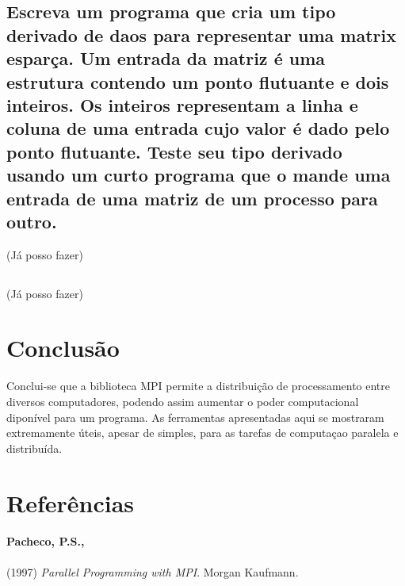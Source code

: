 \documentclass[11pt,a4paper,onecolumn]{article}
\begin{document}
\subsection{Escreva um programa que cria um tipo derivado de daos para representar uma matrix esparça. Um entrada da matriz é uma estrutura contendo um ponto flutuante e dois inteiros. Os inteiros representam a linha e coluna de uma entrada cujo valor é dado pelo ponto flutuante. Teste seu tipo derivado usando um curto programa que o mande uma entrada de uma matriz de um processo para outro.} (Já posso fazer)


\subsection{} (Já posso fazer)

\section{Conclusão}
Conclui-se que a biblioteca MPI permite a distribuição de processamento entre diversos computadores, podendo assim aumentar o poder computacional diponível para um programa.
As ferramentas apresentadas aqui se mostraram extremamente úteis, apesar de simples, para as tarefas de computaçao paralela e distribuída.

\section{Referências}
\paragraph{Pacheco, P.S.,} (1997) \textit{Parallel Programming with MPI}. Morgan Kaufmann.
\end{document}
